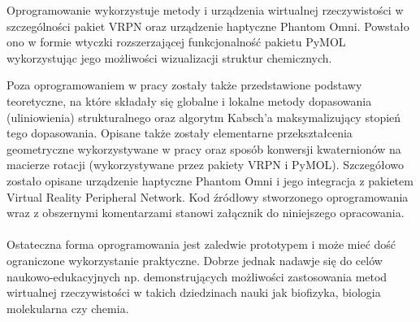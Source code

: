 \documentclass[licencjacka]{pracamgr}
\begin{document}
Oprogramowanie wykorzystuje metody i urządzenia wirtualnej rzeczywistości w szczególności pakiet VRPN oraz urządzenie haptyczne Phantom Omni. Powstało ono w formie wtyczki rozszerzającej funkcjonalność pakietu PyMOL wykorzystując jego możliwości wizualizacji struktur chemicznych.

Poza oprogramowaniem w pracy zostały także przedstawione podstawy teoretyczne, na które składały się globalne i lokalne metody dopasowania (uliniowienia) strukturalnego oraz algorytm Kabsch'a maksymalizujący stopień tego dopasowania. Opisane także zostały elementarne przekształcenia geometryczne wykorzystywane w pracy oraz sposób konwersji kwaternionów na macierze rotacji (wykorzystywane przez pakiety VRPN i PyMOL). Szczegółowo zostało opisane urządzenie haptyczne Phantom Omni i jego integracja z pakietem Virtual Reality Peripheral Network. Kod źródłowy stworzonego oprogramowania wraz z obszernymi komentarzami stanowi załącznik do niniejszego opracowania.
\\
\\
Ostateczna forma oprogramowania jest zaledwie prototypem i może mieć dość ograniczone wykorzystanie praktyczne. Dobrze jednak nadawje się do celów naukowo-edukacyjnych np. demonstrujących możliwości zastosowania metod wirtualnej rzeczywistości w takich dziedzinach nauki jak biofizyka, biologia molekularna czy chemia.
\end{document}
